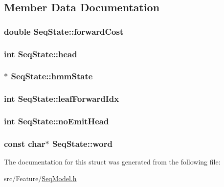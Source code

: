 \subsection{Member Data Documentation}
\hypertarget{struct_seq_state_af59317194ac569d3e0567476bc6fc34f}{
\subsubsection[{forward\+Cost}]{\setlength{\rightskip}{0pt plus 5cm}double Seq\+State\+::forward\+Cost}}\label{struct_seq_state_af59317194ac569d3e0567476bc6fc34f}
\hypertarget{struct_seq_state_a2a12768737860dffb6d7f462ed4c553d}{
\subsubsection[{head}]{\setlength{\rightskip}{0pt plus 5cm}int Seq\+State\+::head}}\label{struct_seq_state_a2a12768737860dffb6d7f462ed4c553d}
\hypertarget{struct_seq_state_a2bb7b33a55ab253bb70216a448efe060}{
\subsubsection[{hmm\+State}]{$\ast$ Seq\+State\+::hmm\+State}}\label{struct_seq_state_a2bb7b33a55ab253bb70216a448efe060}
\hypertarget{struct_seq_state_aac811c88e5600d34a41c8d967498f51a}{
\subsubsection[{leaf\+Forward\+Idx}]{\setlength{\rightskip}{0pt plus 5cm}int Seq\+State\+::leaf\+Forward\+Idx}}\label{struct_seq_state_aac811c88e5600d34a41c8d967498f51a}
\hypertarget{struct_seq_state_a9b863f39df4829c202306838f8d1aae7}{
\subsubsection[{no\+Emit\+Head}]{\setlength{\rightskip}{0pt plus 5cm}int Seq\+State\+::no\+Emit\+Head}}\label{struct_seq_state_a9b863f39df4829c202306838f8d1aae7}
\hypertarget{struct_seq_state_a18489c678649e7f1fe5c277c260fc6d7}{
\subsubsection[{word}]{\setlength{\rightskip}{0pt plus 5cm}const char$\ast$ Seq\+State\+::word}}\label{struct_seq_state_a18489c678649e7f1fe5c277c260fc6d7}


The documentation for this struct was generated from the following file\+:\begin{DoxyCompactItemize}
\item 
src/\+Feature/\hyperlink{_seq_model_8h}{Seq\+Model.\+h}\end{DoxyCompactItemize}

